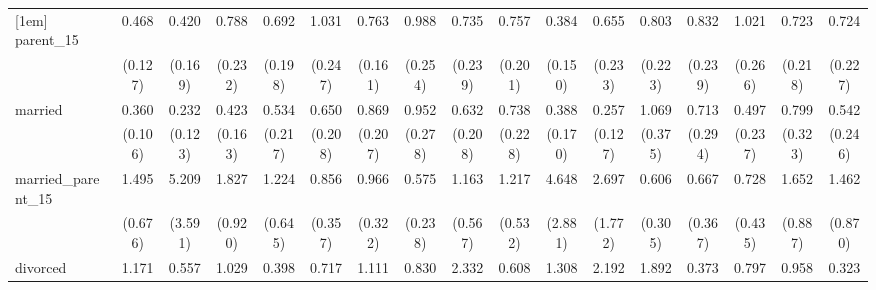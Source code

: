 {\begin{tabular}{l*{16}{c}}
[1em]
parent\_15           &       0.468\sym{**} &       0.420\sym{*}  &       0.788         &       0.692         &       1.031         &       0.763         &       0.988         &       0.735         &       0.757         &       0.384\sym{*}  &       0.655         &       0.803         &       0.832         &       1.021         &       0.723         &       0.724         \\
                    &     (0.127)         &     (0.169)         &     (0.232)         &     (0.198)         &     (0.247)         &     (0.161)         &     (0.254)         &     (0.239)         &     (0.201)         &     (0.150)         &     (0.233)         &     (0.223)         &     (0.239)         &     (0.266)         &     (0.218)         &     (0.227)         \\
[1em]
married             &       0.360\sym{***}&       0.232\sym{**} &       0.423\sym{*}  &       0.534         &       0.650         &       0.869         &       0.952         &       0.632         &       0.738         &       0.388\sym{*}  &       0.257\sym{**} &       1.069         &       0.713         &       0.497         &       0.799         &       0.542         \\
                    &     (0.106)         &     (0.123)         &     (0.163)         &     (0.217)         &     (0.208)         &     (0.207)         &     (0.278)         &     (0.208)         &     (0.228)         &     (0.170)         &     (0.127)         &     (0.375)         &     (0.294)         &     (0.237)         &     (0.323)         &     (0.246)         \\
[1em]
married\_parent\_15   &       1.495         &       5.209\sym{*}  &       1.827         &       1.224         &       0.856         &       0.966         &       0.575         &       1.163         &       1.217         &       4.648\sym{*}  &       2.697         &       0.606         &       0.667         &       0.728         &       1.652         &       1.462         \\
                    &     (0.676)         &     (3.591)         &     (0.920)         &     (0.645)         &     (0.357)         &     (0.322)         &     (0.238)         &     (0.567)         &     (0.532)         &     (2.881)         &     (1.772)         &     (0.305)         &     (0.367)         &     (0.435)         &     (0.887)         &     (0.870)         \\
[1em]
divorced            &       1.171         &       0.557         &       1.029         &       0.398         &       0.717         &       1.111         &       0.830         &       2.332\sym{*}  &       0.608         &       1.308         &       2.192         &       1.892         &       0.373         &       0.797         &       0.958         &       0.323         \\

\end{tabular}}
